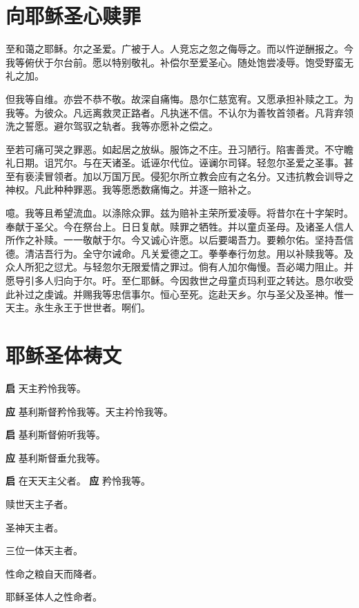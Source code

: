 \documentclass[UTF8,17pt]{ctexart}
\newcommand{\Noto}{\CJKfamily{Noto}}
\begin{document}
\section{向耶稣圣⼼赎罪}

⾄和蔼之耶稣。尔之圣爱。⼴被于⼈。⼈竞忘之忽之侮辱之。⽽以忤逆酬报之。今我等俯伏于尔台前。愿以特别敬礼。补偿尔⾄爱圣⼼。随处饱尝凌辱。饱受野蛮⽆礼之加。

但我等⾃维。亦尝不恭不敬。故深⾃痛悔。恳尔仁慈宽宥。又愿承担补赎之⼯。为我等。为彼众。凡远离救灵正路者。凡执迷不信。不认尔为善牧⾸领者。凡背弃领洗之誓愿。避尔驾驭之轨{\Noto{\char"2B410}}者。我等亦愿补之偿之。

⾄若可痛可哭之罪恶。如起居之放纵。服饰之不庄。丑习陋⾏。陷害善灵。不守瞻礼⽇期。诅咒尔。与在天诸圣。诋诬尔代位。诬谰尔司铎。轻忽尔圣爱之圣事。甚⾄有亵渎冒领者。加以万国万民。侵犯尔所⽴教会应有之名分。又违抗教会训导之神权。凡此种种罪恶。我等愿悉数痛悔之。并逐⼀赔补之。

噫。我等且希望流⾎。以涤除众罪。兹为赔补主荣所爱凌辱。将昔尔在⼗字架时。奉献于圣⽗。今在祭台上。⽇⽇复献。赎罪之牺牲。并以童贞圣母。及诸圣⼈信⼈所作之补赎。⼀⼀敬献于尔。今又诚⼼许愿。以后要竭吾⼒。要赖尔佑。坚持吾信德。清洁吾⾏为。全守尔诫命。凡关爱德之⼯。拳拳奉⾏勿怠。⽤以补赎我等。及众⼈所犯之愆尤。与轻忽尔⽆限爱情之罪过。倘有⼈加尔侮慢。吾必竭⼒阻⽌。并愿导引多⼈归向于尔。吁。⾄仁耶稣。今因救世之母童贞玛利亚之转达。恳尔收受此补过之虔诚。并赐我等忠信事尔。恒⼼⾄死。迄赴天乡。尔与圣⽗及圣神。惟⼀天主。永⽣永王于世世者。啊们。

\section{耶稣圣体祷⽂}

\textbf{启} \quad 天主矜怜我等。

\textbf{应} \quad 基利斯督矜怜我等。天主衿怜我等。

\textbf{启} \quad 基利斯督俯听我等。

\textbf{应} \quad 基利斯督垂允我等。

\textbf{启} \quad 在天天主⽗者。 \hfill \textbf{应} \quad 矜怜我等。

 赎世天主⼦者。

 圣神天主者。

 三位⼀体天主者。

 性命之粮⾃天⽽降者。

 耶稣圣体⼈之性命者。
\end{document}
